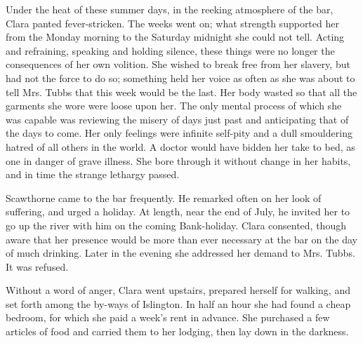 Under the heat of these summer days, in the reeking atmosphere of the
bar, Clara panted fever-stricken. The weeks went on; what strength
supported her from the Monday morning to the Saturday midnight she could
not tell. Acting and refraining, speaking and holding silence, these
things were no longer the consequences of her own volition. She wished
to break free from her slavery, but had not the force to do so;
something held her voice as often as she was about to tell Mrs. Tubbs
that this week would be the last. Her body wasted so that all the
garments she wore were loose upon her. The only mental process of which
she was capable was reviewing the misery of days just past and
anticipating that of the days to come. Her only feelings were infinite
self-pity and a dull smouldering hatred of all others in the world. A
doctor would have bidden her take {}to bed, as one in danger of grave
illness. She bore through it without change in her habits, and in time
the strange lethargy passed.

Scawthorne came to the bar frequently. He remarked often on her look of
suffering, and urged a holiday. At length, near the end of July, he
invited her to go up the river with him on the coming Bank-holiday.
Clara consented, though aware that her presence would be more than ever
necessary at the bar on the day of much drinking. Later in the evening
she addressed her demand to Mrs. Tubbs. It was refused.

Without a word of anger, Clara went upstairs, prepared herself for
walking, and set forth among the by-ways of Islington. In half an hour
she had found a cheap bedroom, for which she paid a week's rent in
advance. She purchased a few articles of food and carried them to her
lodging, then lay down in the darkness.
